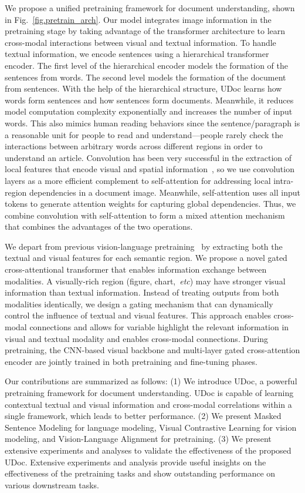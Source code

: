 \documentclass{article}
\def\etc{\emph{etc}}
\begin{document}
	We propose a unified pretraining framework for document understanding, shown in Fig.~\ref{fig.pretrain_arch}. Our model integrates image information in the pretraining stage by taking advantage of the transformer architecture to learn {cross-modal interactions} between visual and textual information. To handle textual information, we {encode sentences using} a hierarchical transformer encoder. The first level of the hierarchical encoder models the formation of the sentences from words. The second level models the formation of the document from sentences. With the help of the hierarchical structure, UDoc learns how words form sentences and how sentences form documents. Meanwhile, it reduces model computation complexity exponentially and increases the number of input words. This also mimics human reading behaviors since the sentence/paragraph is a reasonable unit for people to read and understand{---people} rarely check the interactions between arbitrary words across different {regions} in order to understand {an} article. {Convolution} has been very successful in the extraction of local features that encode visual and spatial information~\cite{gu2018recent}, so we use convolution layers as a more efficient complement to self-attention for addressing local intra-region dependencies in a document image. Meanwhile, self-attention uses all input tokens to generate attention weights for capturing global dependencies. Thus, we combine convolution with self-attention to form a mixed attention mechanism that combines the advantages of the two operations.
	
	We depart from previous vision-language pretraining~\cite{lu2019vilbert,gu2020self} by extracting both the textual and visual features for each semantic region. We propose a novel gated cross-attentional transformer that enables information exchange between modalities. A visually-rich region (figure, chart,~\etc) may have stronger visual information than textual information.
	Instead of treating outputs from both modalities identically, we design a gating mechanism that can dynamically control the influence of textual and visual features. This approach enables cross-modal connections and allows for variable highlight the relevant information in visual and textual modality and enables cross-modal connections. During pretraining, the CNN-based visual backbone and multi-layer gated cross-attention encoder are jointly trained in both pretraining and fine-tuning phases.
	
	
	Our contributions are summarized as follows:
	(1) We introduce UDoc, a powerful pretraining framework for document understanding. UDoc is capable of learning contextual textual and visual information and cross-modal {correlations within} a single framework, which leads to better performance.
	(2) We present Masked Sentence Modeling for language modeling, Visual Contrastive Learning for vision modeling, and Vision-Language Alignment for pretraining.
	(3) We present extensive experiments and analyses to validate the effectiveness of the proposed UDoc.
	Extensive experiments and analysis provide useful insights on the effectiveness of {the} pretraining tasks and show outstanding performance on {various} downstream tasks.
	
\end{document}
